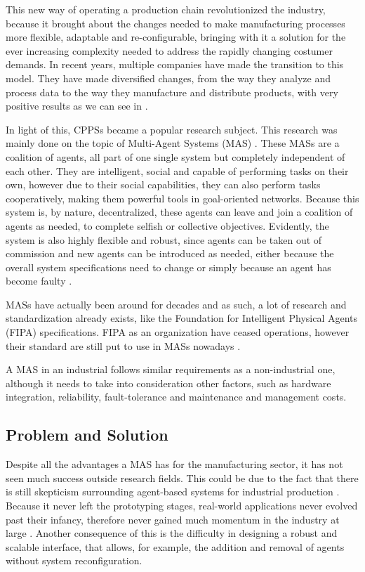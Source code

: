This new way of operating a production chain revolutionized the industry, because it brought about the changes needed to make manufacturing processes more flexible, adaptable and re-configurable, bringing with it a solution for the ever increasing complexity needed to address the rapidly changing costumer demands.
In recent years, multiple companies have made the transition to this model. They have made diversified changes, from the way they analyze and process data to the way they manufacture and distribute products, with very positive results as we can see in \cite{rit01}.


In light of this, CPPSs became a popular research subject. This research was mainly done on the topic of Multi-Agent Systems (MAS) \cite{sakurada01} \cite{karnouskos01}. These MASs are a coalition of agents, all part of one single system but completely independent of each other. They are intelligent, social and capable of performing tasks on their own, however due to their social capabilities, they can also perform tasks cooperatively, making them powerful tools in goal-oriented networks. Because this system is, by nature, decentralized, these agents can leave and join a coalition of agents as needed, to complete selfish or collective objectives. Evidently, the system is also highly flexible and robust, since agents can be taken out of commission and new agents can be introduced as needed, either because the overall system specifications need to change or simply because an agent has become faulty \cite{paulo02}.

MASs have actually been around for decades and as such, a lot of research and standardization already exists, like the Foundation for Intelligent Physical Agents (FIPA) specifications. FIPA as an organization have ceased operations, however their standard are still put to use in MASs nowadays \cite{FIPA_website}.

A MAS in an industrial follows similar requirements as a non-industrial one, although it needs to take into consideration other factors, such as hardware integration, reliability, fault-tolerance and maintenance and management costs.

\subsection{Problem and Solution}

Despite all the advantages a MAS has for the manufacturing sector, it has not seen much success outside research fields. This could be due to the fact that there is still skepticism surrounding agent-based systems for industrial production \cite{marschall01}. Because it never left the prototyping stages, real-world applications never evolved past their infancy, therefore never gained much momentum in the industry at large \cite{karnouskos02}. Another consequence of this is the difficulty in designing a robust and scalable interface, that allows, for example, the addition and removal of agents without system reconfiguration. %

